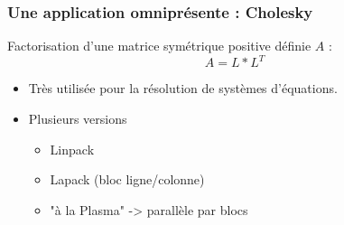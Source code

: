 \documentclass[xcolor={usenames,dvipsnames,svgnames,table}, aspectratio=43]{beamer}
\begin{document}
\begin{frame}
\begin{figure}
{    }%
  \end{figure}
\end{frame}

\begin{frame}
\frametitle{Une application omniprésente : Cholesky}

Factorisation d'une matrice symétrique positive définie $A$ :
$$ A = L*L^T$$

\begin{itemize}
\item Très utilisée pour la résolution de systèmes d'équations.

\item Plusieurs versions

  \begin{itemize}
    \item Linpack
    \item Lapack (bloc ligne/colonne)
    \item "à la Plasma" -> parallèle par blocs
  \end{itemize}
\end{itemize}

\end{frame}
\end{document}
